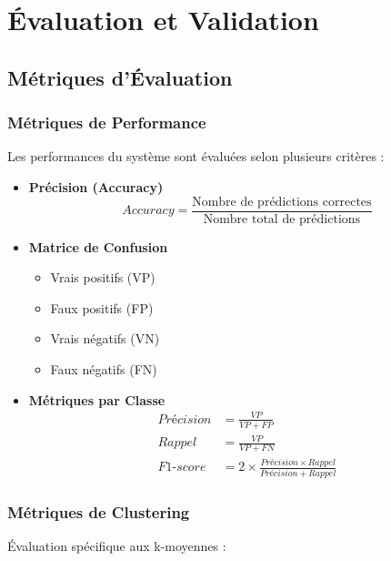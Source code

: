 \chapter{Évaluation et Validation}

\section{Métriques d'Évaluation}

\subsection{Métriques de Performance}
Les performances du système sont évaluées selon plusieurs critères :

\begin{itemize}
    \item \textbf{Précision (Accuracy)}
    \begin{equation}
        Accuracy = \frac{\text{Nombre de prédictions correctes}}{\text{Nombre total de prédictions}}
    \end{equation}

    \item \textbf{Matrice de Confusion}
    \begin{itemize}
        \item Vrais positifs (VP)
        \item Faux positifs (FP)
        \item Vrais négatifs (VN)
        \item Faux négatifs (FN)
    \end{itemize}

    \item \textbf{Métriques par Classe}
    \begin{align*}
        Précision &= \frac{VP}{VP + FP} \\
        Rappel &= \frac{VP}{VP + FN} \\
        F1\text{-}score &= 2 \times \frac{Précision \times Rappel}{Précision + Rappel}
    \end{align*}
\end{itemize}

\subsection{Métriques de Clustering}
Évaluation spécifique aux k-moyennes :

